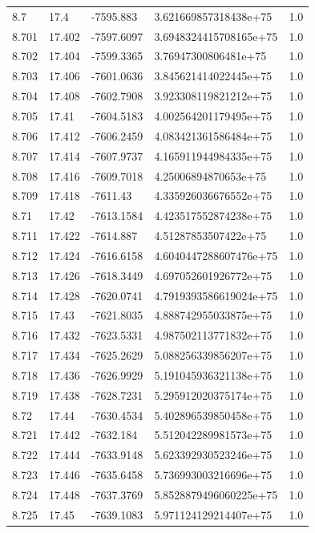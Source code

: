 \begin{tabular}{lllll}
8.7 & 17.4 & -7595.883 & 3.621669857318438e+75 & 1.0 \\
8.701 & 17.402 & -7597.6097 & 3.6948324415708165e+75 & 1.0 \\
8.702 & 17.404 & -7599.3365 & 3.76947300806481e+75 & 1.0 \\
8.703 & 17.406 & -7601.0636 & 3.845621414022445e+75 & 1.0 \\
8.704 & 17.408 & -7602.7908 & 3.923308119821212e+75 & 1.0 \\
8.705 & 17.41 & -7604.5183 & 4.002564201179495e+75 & 1.0 \\
8.706 & 17.412 & -7606.2459 & 4.083421361586484e+75 & 1.0 \\
8.707 & 17.414 & -7607.9737 & 4.165911944984335e+75 & 1.0 \\
8.708 & 17.416 & -7609.7018 & 4.25006894870653e+75 & 1.0 \\
8.709 & 17.418 & -7611.43 & 4.335926036676552e+75 & 1.0 \\
8.71 & 17.42 & -7613.1584 & 4.423517552874238e+75 & 1.0 \\
8.711 & 17.422 & -7614.887 & 4.51287853507422e+75 & 1.0 \\
8.712 & 17.424 & -7616.6158 & 4.6040447288607476e+75 & 1.0 \\
8.713 & 17.426 & -7618.3449 & 4.697052601926772e+75 & 1.0 \\
8.714 & 17.428 & -7620.0741 & 4.7919393586619024e+75 & 1.0 \\
8.715 & 17.43 & -7621.8035 & 4.888742955033875e+75 & 1.0 \\
8.716 & 17.432 & -7623.5331 & 4.987502113771832e+75 & 1.0 \\
8.717 & 17.434 & -7625.2629 & 5.088256339856207e+75 & 1.0 \\
8.718 & 17.436 & -7626.9929 & 5.191045936321138e+75 & 1.0 \\
8.719 & 17.438 & -7628.7231 & 5.295912020375174e+75 & 1.0 \\
8.72 & 17.44 & -7630.4534 & 5.402896539850458e+75 & 1.0 \\
8.721 & 17.442 & -7632.184 & 5.512042289981573e+75 & 1.0 \\
8.722 & 17.444 & -7633.9148 & 5.623392930523246e+75 & 1.0 \\
8.723 & 17.446 & -7635.6458 & 5.736993003216696e+75 & 1.0 \\
8.724 & 17.448 & -7637.3769 & 5.8528879496060225e+75 & 1.0 \\
8.725 & 17.45 & -7639.1083 & 5.971124129214407e+75 & 1.0 \\

\end{tabular}
